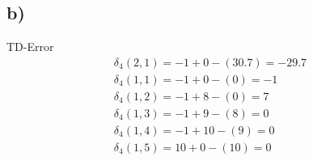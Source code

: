 \documentclass[paper=a4, fontsize=10pt]{scrartcl} %
\numberwithin{equation}{section} %
\numberwithin{figure}{section} %
\numberwithin{table}{section} %
\begin{document}
\subsection{b)}
TD-Error
\begin{align*}
	\delta _4 (2,1) = -1 + 0 - (30.7) = -29.7 \\
	\delta _4 (1,1) = -1 + 0 - (0) = -1 \\
	\delta _4 (1,2) = -1 + 8 - (0) = 7 \\
	\delta _4 (1,3) = -1 + 9 - (8) = 0 \\
	\delta _4 (1,4) = -1 + 10 - (9) =0  \\
	\delta _4 (1,5) = 10 + 0 -(10) = 0 \\
\end{align*}


%			
%		
%
%	
\end{document}
